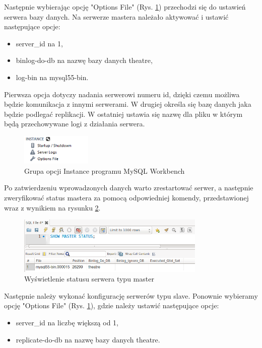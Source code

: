 \documentclass{mgr}
\begin{document}
Następnie wybierając opcję "Options File" (Rys. \ref{fig:wb-instance}) przechodzi się do ustawień serwera bazy danych. Na serwerze mastera należało aktywować i ustawić następujące opcje:

\begin{itemize}
	\item server\_id na 1,
	\item binlog-do-db na nazwę bazy danych theatre,
	\item log-bin na mysql55-bin.
\end{itemize}

Pierwsza opcja dotyczy nadania serwerowi numeru id, dzięki czemu możliwa będzie komunikacja z innymi serwerami. W drugiej określa się bazę danych jaka będzie podlegać replikacji. W ostatniej ustawia się nazwę dla pliku w którym będą przechowywane logi z działania serwera.

\begin{figure}[!ht]
	\centering
	\includegraphics[width=0.3\textwidth]{images/wb_instance.png}
	\caption{Grupa opcji Instance programu MySQL Workbench}
	\label{fig:wb-instance}
\end{figure}

Po zatwierdzeniu wprowadzonych danych warto zrestartować serwer, a następnie zweryfikować status mastera za pomocą odpowiedniej komendy, przedstawionej wraz z wynikiem na rysunku \ref{fig:wb-master-status}.

\begin{figure}[!ht]
	\centering
	\includegraphics[width=0.8\textwidth]{images/wb_master_status.png}
	\caption{Wyświetlenie statusu serwera typu master}
	\label{fig:wb-master-status}
\end{figure}

Następnie należy wykonać konfigurację serwerów typu slave. Ponownie wybieramy opcję "Options File" (Rys. \ref{fig:wb-instance}), gdzie należy ustawić następujące opcje:

\begin{itemize}
	\item server\_id na liczbę większą od 1,
	\item replicate-do-db na nazwę bazy danych theatre.
\end{itemize}
\end{document}
